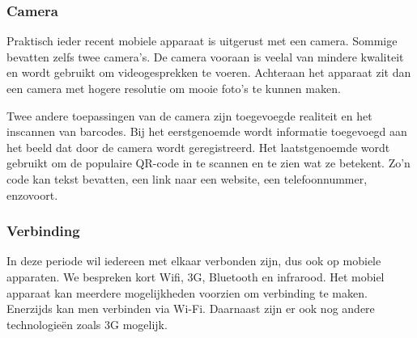 \subsubsection{Camera}
Praktisch ieder recent mobiele apparaat is uitgerust met een camera. 
Sommige bevatten zelfs twee camera's. 
De camera vooraan is veelal van mindere kwaliteit en wordt gebruikt om videogesprekken te voeren. 
Achteraan het apparaat zit dan een camera met hogere resolutie om mooie foto's te kunnen maken.

Twee andere toepassingen van de camera zijn toegevoegde realiteit en het inscannen van barcodes.
Bij het eerstgenoemde wordt informatie toegevoegd aan het beeld dat door de camera wordt geregistreerd.
Het laatstgenoemde wordt gebruikt om de populaire QR-code in te scannen en te zien wat ze betekent.
Zo'n code kan tekst bevatten, een link naar een website, een telefoonnummer, enzovoort. 

\subsubsection{Verbinding}

In deze periode wil iedereen met elkaar verbonden zijn, dus ook op mobiele apparaten.
We bespreken kort Wifi, 3G, Bluetooth en infrarood.
Het mobiel apparaat kan meerdere mogelijkheden voorzien om verbinding te maken. 
Enerzijds kan men verbinden via Wi-Fi. Daarnaast zijn er ook nog andere technologieën zoals 3G mogelijk.

% 
% 

